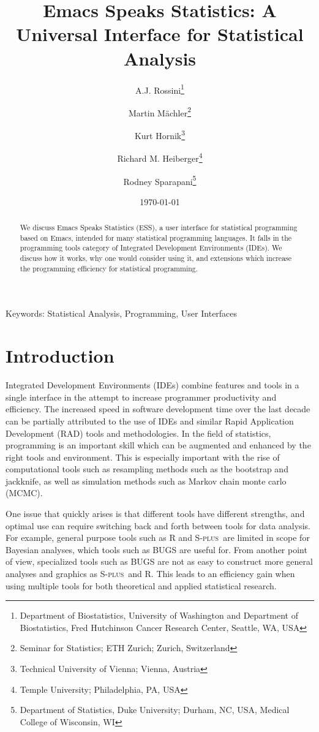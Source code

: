 \documentclass{article}
\title{Emacs Speaks Statistics: A Universal Interface for
  Statistical Analysis}
\author{A.J. Rossini\footnote{Department of Biostatistics, University
    of Washington and Department of Biostatistics, Fred Hutchinson
    Cancer Research Center, Seattle, WA, USA} \and Martin
  M\"achler\footnote{Seminar for Statistics; ETH Zurich; Zurich,
    Switzerland} \and Kurt 
  Hornik\footnote{Technical University of Vienna; Vienna, Austria} \and
  Richard M. Heiberger\footnote{Temple University; Philadelphia, PA,
    USA} \and Rodney Sparapani\footnote{Department of Statistics, Duke
    University; Durham, NC, USA, Medical College of Wisconsin, WI}}
\date{\today}
\newif\ifpdf
\newcommand*{\Splus}{\textsc{S-plus}}
\begin{document}
\ifpdf
  \DeclareGraphicsExtensions{.jpg,.pdf,.png,.mps}
\fi


\maketitle

Keywords: Statistical Analysis, Programming, User Interfaces

\begin{abstract}
  We discuss Emacs Speaks Statistics (ESS), a user interface for
  statistical programming based on Emacs, intended for many
  statistical programming languages.  It falls in the programming
  tools category of Integrated Development Environments (IDEs).  We
  discuss how it works, why one would consider using it, and
  extensions which increase the programming efficiency for statistical
  programming.
\end{abstract}

\section{Introduction}
\label{sec:intro}

Integrated Development Environments (IDEs) combine features and tools
in a single interface in the attempt to increase programmer
productivity and efficiency.  The increased speed in software
development time over the last decade can be partially attributed to
the use of IDEs and similar Rapid Application Development (RAD) tools
and methodologies.  In the field of statistics, programming is an
important skill which can be augmented and enhanced by the right tools
and environment.  This is especially important with the rise of
computational tools such as resampling methods such as the bootstrap
and jackknife, as well as simulation methods such as Markov chain
monte carlo (MCMC).  

One issue that quickly arises is that different tools have different
strengths, and optimal use can require switching back and forth
between tools for data analysis.  For example, general purpose tools
such as R \citep{ihak:gent:1996} and \Splus\ are limited in scope for
Bayesian analyses, which tools such as BUGS are useful for.  From
another point of view, specialized tools such as BUGS are not as easy
to construct more general analyses and graphics as \Splus\ and R.  This
leads to an efficiency gain when using multiple tools for both
theoretical and applied statistical research.
\end{document}
